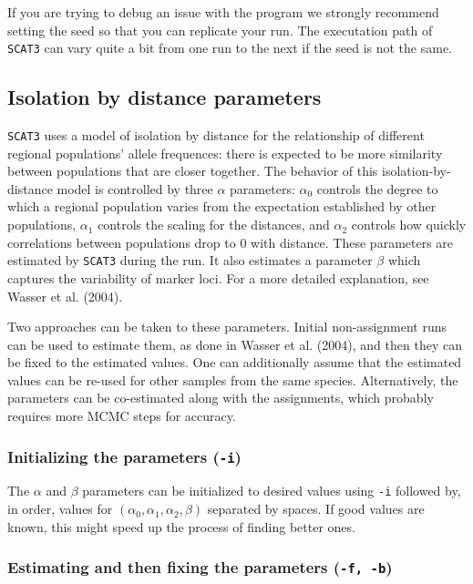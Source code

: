 \documentclass[10pt,titlepage,times,letterpaper]{article}
\def\SCAT{{\tt SCAT3} }
\begin{document}
If you are trying to debug an issue with the program we strongly
recommend setting the seed so that you can replicate your run.  The
executation path of \SCAT can vary quite a bit from one run to the
next if the seed is not the same.

\subsection{Isolation by distance parameters}

\SCAT uses a model of isolation by distance for the relationship of
different regional populations' allele frequences:  there is expected to
be more similarity between populations that are closer together.  The
behavior of this isolation-by-distance model is controlled by three
$\alpha$ parameters:  $\alpha_0$ controls the degree to which a regional
population varies from the expectation established by other populations,
$\alpha_1$ controls the scaling for the distances, and $\alpha_2$
controls how quickly correlations between populations drop to 0 with distance.
These parameters are estimated by \SCAT during the run.
It also estimates a parameter $\beta$ which captures the variability
of marker loci.  For a more detailed explanation, see Wasser et al. (2004).

Two approaches can be taken to these parameters.  Initial non-assignment
runs can be used to estimate them, as done in Wasser et al. (2004), and then
they can be fixed to the estimated values.  One can additionally assume
that the estimated values can be re-used for other samples from the same
species.  Alternatively, the parameters can be co-estimated along with
the assignments, which probably requires more MCMC steps for accuracy.

\subsubsection{Initializing the parameters ({\tt -i})}

The $\alpha$ and $\beta$ parameters can be initialized to desired values
using {\tt -i} followed by, in order, values for 
$(\alpha_0,\alpha_1,\alpha_2,\beta)$ separated by spaces.
If good values are known, this might speed up the process of finding better
ones.  

\subsubsection{Estimating and then fixing the parameters ({\tt -f, -b})}
\end{document}
